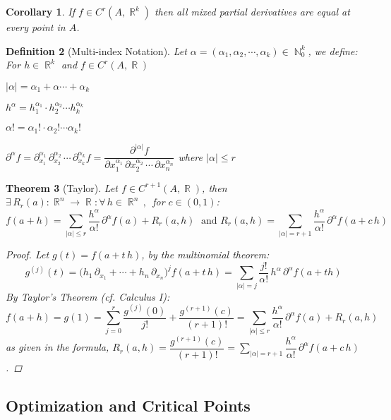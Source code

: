 \documentclass[12pt]{article}
\newcommand{\Forall}[1]{\forall\,{#1}\,,\,}
\newcommand{\Exist}[1]{\exists\,{#1}:}
\DeclareMathOperator{\R}{\mathbb{R}}
\DeclareMathOperator{\N}{\mathbb{N}}
\newcommand{\der}[2][n]{{#2}^{(#1)}}
\newtheorem{theorem}{Theorem}[subsection]
\newtheorem{definition}[theorem]{Definition}
\newtheorem{corollary}[theorem]{Corollary}
\begin{document}
\begin{corollary}
  If $f\in C^r(A,\R^k)$ then all mixed partial derivatives are equal at every point in $A$.
\end{corollary}

\begin{definition}[Multi-index Notation]
  Let $\alpha=(\alpha_1,\alpha_2,\cdots,\alpha_k)\in\N_0^k$, we define: For $h\in\R^k$ and $f\in C^r(A,\R)$
  \begin{compactenum}[(i)]
    \item $|\alpha|=\alpha_1+\alpha\cdots+\alpha_k$
    \item $h^\alpha=h_1^{\alpha_1}\cdot h_2^{\alpha_2}\cdots h_k^{\alpha_k}$
    \item $\alpha!=\alpha_1!\cdot\alpha_2!\cdots\alpha_k!$
    \item $\partial^\alpha f=\partial_{x_1}^{\alpha_1}\,\partial_{x_2}^{\alpha_2}\,\cdots\,\partial_{x_k}^{\alpha_k}f=\dfrac{\partial^{|\alpha|} f}{\partial x_1^{\alpha_1}\,\partial x_2^{\alpha_2}\,\cdots\,\partial x_n^{\alpha_n}}$ where $|\alpha|\leq r$
  \end{compactenum}
\end{definition}

\begin{theorem}[Taylor]
  \label{taylor}
  Let $f\in C^{r+1}(A,\R)$, then $\Exist{R_r(a):\R^n\to\R}\Forall{h\in\R^n}$ for $c\in(0,1)$: $$f(a+h)=\sum_{|\alpha|\leq r}\frac{h^\alpha}{\alpha!}\,\partial^\alpha f(a)+R_r(a,h)\;\text{ and }R_r(a,h)=\sum_{|\alpha|=r+1}\dfrac{h^\alpha}{\alpha!}\,\partial^\alpha f(a+c\,h)$$
  \begin{proof}
    Let $g(t)=f(a+t\,h)$, by the multinomial theorem: $$\der[j]{g}(t)=\big(h_1\,\partial_{x_1}+\cdots+h_n\,\partial_{x_n}\big)^j f (a+t\,h)=\sum_{|\alpha|=j}\dfrac{j!}{\alpha!}\,h^\alpha\,\partial^\alpha f(a+th)$$ By Taylor's Theorem (cf. Calculus I): $$f(a+h)=g(1)=\sum_{j=0}^r \frac{\der[j]{g}(0)}{j!}+\frac{\der[r+1]{g}(c)}{(r+1)!}=\sum_{|\alpha|\leq r}\frac{h^\alpha}{\alpha!}\,\partial^\alpha f(a)+R_r(a,h)$$ as given in the formula, $R_r(a,h)=\dfrac{\der[r+1]{g}(c)}{(r+1)!}=\sum_{|\alpha|=r+1}\dfrac{h^\alpha}{\alpha!}\,\partial^\alpha f(a+c\,h)$.
  \end{proof}
\end{theorem}

\pagebreak

\subsection{Optimization and Critical Points}
\end{document}
